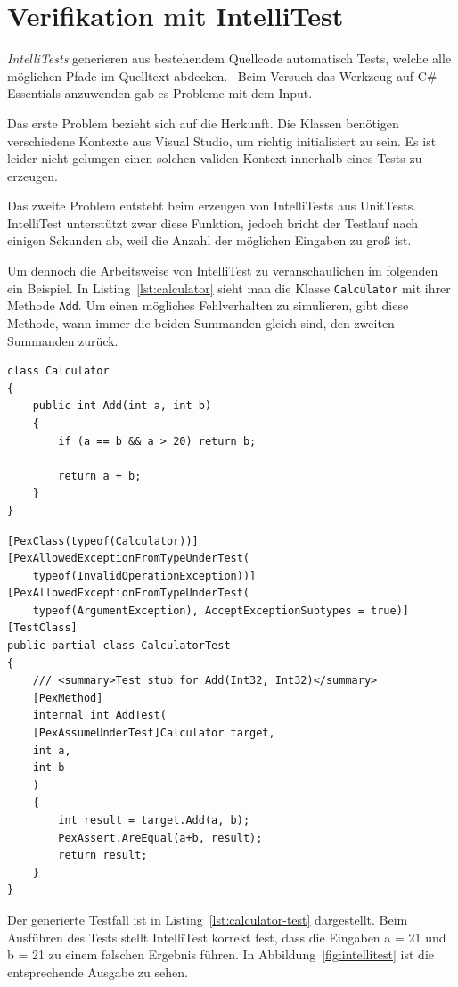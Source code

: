 %
\section{Verifikation mit IntelliTest}

\emph{IntelliTests} generieren aus bestehendem Quellcode automatisch Tests, welche alle möglichen Pfade im Quelltext abdecken.~\cite{intellitest-correctness} Beim Versuch das Werkzeug auf C\# Essentials anzuwenden gab es Probleme mit dem Input. 

Das erste Problem bezieht sich auf die Herkunft. Die Klassen benötigen verschiedene Kontexte aus Visual Studio, um richtig initialisiert zu sein. Es ist leider nicht gelungen einen solchen validen Kontext innerhalb eines Tests zu erzeugen.

Das zweite Problem entsteht beim erzeugen von IntelliTests aus UnitTests. IntelliTest unterstützt zwar diese Funktion, jedoch bricht der Testlauf nach einigen Sekunden ab, weil die Anzahl der möglichen Eingaben zu groß ist.

Um dennoch die Arbeitsweise von IntelliTest zu veranschaulichen im folgenden ein Beispiel. In Listing~\ref{lst:calculator} sieht man die Klasse \texttt{Calculator} mit ihrer Methode \texttt{Add}. Um einen mögliches Fehlverhalten zu simulieren, gibt diese Methode, wann immer die beiden Summanden gleich sind, den zweiten Summanden zurück.

\begin{lstlisting}[caption={Klasse \texttt{Calculator}},
label=lst:calculator]
class Calculator
{
	public int Add(int a, int b)
	{
		if (a == b && a > 20) return b;
		
		return a + b;
	}
}
\end{lstlisting}

\begin{lstlisting}[caption={Test \texttt{Calculator}},
label=lst:calculator-test]
[PexClass(typeof(Calculator))]
[PexAllowedExceptionFromTypeUnderTest(
	typeof(InvalidOperationException))]
[PexAllowedExceptionFromTypeUnderTest(
	typeof(ArgumentException), AcceptExceptionSubtypes = true)]
[TestClass]
public partial class CalculatorTest
{
	/// <summary>Test stub for Add(Int32, Int32)</summary>
	[PexMethod]
	internal int AddTest(
	[PexAssumeUnderTest]Calculator target,
	int a,
	int b
	)
	{
		int result = target.Add(a, b);
		PexAssert.AreEqual(a+b, result);
		return result;
	}
}
\end{lstlisting}

Der generierte Testfall ist in Listing~\ref{lst:calculator-test} dargestellt. Beim Ausführen des Tests stellt IntelliTest korrekt fest, dass die Eingaben a = 21 und b = 21 zu einem falschen Ergebnis führen. In Abbildung~\ref{fig:intellitest} ist die entsprechende Ausgabe zu sehen.

